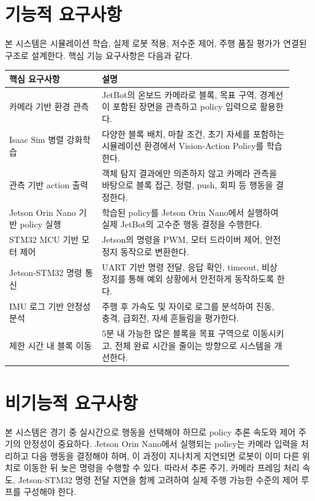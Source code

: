 \documentclass[titlepage]{pnureport}
\begin{document}
\section{기능적 요구사항}

본 시스템은 시뮬레이션 학습, 실제 로봇 적용, 저수준 제어, 주행 품질 평가가 연결된 구조로 설계한다. 핵심 기능 요구사항은 다음과 같다.

\begin{longtable}{p{0.30\linewidth}p{0.62\linewidth}}
\toprule
핵심 요구사항 & 설명 \\
\midrule
\endhead
카메라 기반 환경 관측 & JetBot의 온보드 카메라로 블록, 목표 구역, 경계선이 포함된 장면을 관측하고 policy 입력으로 활용한다. \\
Isaac Sim 병렬 강화학습 & 다양한 블록 배치, 마찰 조건, 초기 자세를 포함하는 시뮬레이션 환경에서 Vision-Action Policy를 학습한다. \\
관측 기반 action 출력 & 객체 탐지 결과에만 의존하지 않고 카메라 관측을 바탕으로 블록 접근, 정렬, push, 회피 등 행동을 결정한다. \\
Jetson Orin Nano 기반 policy 실행 & 학습된 policy를 Jetson Orin Nano에서 실행하여 실제 JetBot의 고수준 행동 결정을 수행한다. \\
STM32 MCU 기반 모터 제어 & Jetson의 명령을 PWM, 모터 드라이버 제어, 안전 정지 동작으로 변환한다. \\
Jetson-STM32 명령 통신 & UART 기반 명령 전달, 응답 확인, timeout, 비상 정지를 통해 예외 상황에서 안전하게 동작하도록 한다. \\
IMU 로그 기반 안정성 분석 & 주행 후 가속도 및 자이로 로그를 분석하여 진동, 충격, 급회전, 자세 흔들림을 평가한다. \\
제한 시간 내 블록 이동 & 5분 내 가능한 많은 블록을 목표 구역으로 이동시키고, 전체 완료 시간을 줄이는 방향으로 시스템을 개선한다. \\
\bottomrule
\end{longtable}

\section{비기능적 요구사항}

본 시스템은 경기 중 실시간으로 행동을 선택해야 하므로 policy 추론 속도와 제어 주기의 안정성이 중요하다. Jetson Orin Nano에서 실행되는 policy는 카메라 입력을 처리하고 다음 행동을 결정해야 하며, 이 과정이 지나치게 지연되면 로봇이 이미 다른 위치로 이동한 뒤 늦은 명령을 수행할 수 있다. 따라서 추론 주기, 카메라 프레임 처리 속도, Jetson-STM32 명령 전달 지연을 함께 고려하여 실제 주행 가능한 수준의 제어 루프를 구성해야 한다.
\end{document}
